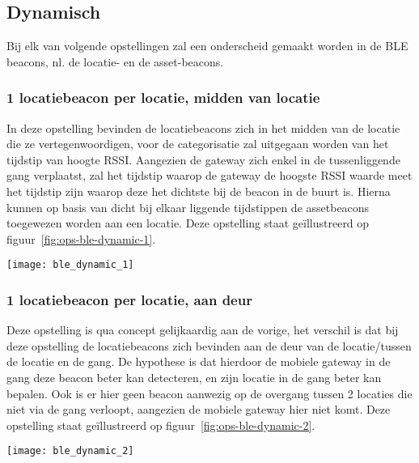 \subsection{Dynamisch}
Bij elk van volgende opstellingen zal een onderscheid gemaakt worden in de BLE beacons, nl. de locatie- en de asset-beacons.

\subsubsection{1 locatiebeacon per locatie, midden van locatie}
\begin{minipage}{0.65\textwidth}
In deze opstelling bevinden de locatiebeacons zich in het midden van de locatie die ze vertegenwoordigen, voor de categorisatie zal uitgegaan worden van het tijdstip van hoogte RSSI. Aangezien de gateway zich enkel in de tussenliggende gang verplaatst, zal het tijdstip waarop de gateway de hoogste RSSI waarde meet het tijdstip zijn waarop deze het dichtste bij de beacon in de buurt is. Hierna kunnen op basis van dicht bij elkaar liggende tijdstippen de assetbeacons toegewezen worden aan een locatie. Deze opstelling staat geïllustreerd op figuur~\ref{fig:ops-ble-dynamic-1}.
\end{minipage}
\hfill
\begin{minipage}{0.30\textwidth}
	\texttt{[image: ble\_dynamic\_1]}
	\label{fig:ops-ble-dynamic-1}
\end{minipage}

\subsubsection{1 locatiebeacon per locatie, aan deur}
\begin{minipage}{0.65\textwidth}
Deze opstelling is qua concept gelijkaardig aan de vorige, het verschil is dat bij deze opstelling de locatiebeacons zich bevinden aan de deur van de locatie/tussen de locatie en de gang. De hypothese is dat hierdoor de mobiele gateway in de gang deze beacon beter kan detecteren, en zijn locatie in de gang beter kan bepalen. Ook is er hier geen beacon aanwezig op de overgang tussen 2 locaties die niet via de gang verloopt, aangezien de mobiele gateway hier niet komt. Deze opstelling staat geïllustreerd op figuur~\ref{fig:ops-ble-dynamic-2}.
\end{minipage}
\hfill
\begin{minipage}{0.30\textwidth}
	\texttt{[image: ble\_dynamic\_2]}
	\label{fig:ops-ble-dynamic-2}
\end{minipage}

